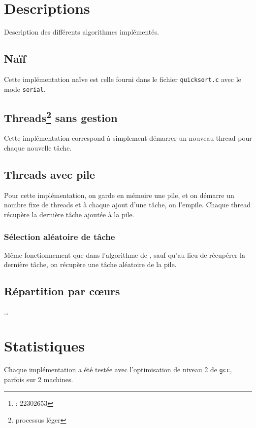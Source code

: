 \documentclass{article}
\title{\docTitle}
\author{\href{\authorMail}{\anri}\thanks{\anri : 22302653}}
\date{Année universitaire 2023-2024}
\newcommand{\docref}[1]{\textit{\nameref{#1}}} %
\def\coeurs{c\oe{}urs}
\begin{document}
\maketitle
\flushbottom
\tableofcontents
\clearpage

\section{Descriptions}
Description des différents algorithmes implémentés.

\subsection{Naïf}
Cette implémentation naïve est celle fourni dans le fichier
\texttt{quicksort.c} avec le mode \texttt{serial}.

\subsection[Threads sans gestion]{%
  Threads\footnote{processus léger} sans gestion}
Cette implémentation correspond à simplement démarrer un nouveau thread
pour chaque nouvelle tâche.

\subsection{Threads avec pile}\label{desc:th_pile}
Pour cette implémentation, on garde en mémoire une pile,
et on démarre un nombre fixe de threads et à chaque ajout d'une tâche,
on l'empile. Chaque thread récupère la dernière tâche ajoutée à la pile.

\subsubsection{Sélection aléatoire de tâche}
Même fonctionnement que dans l'algorithme de \docref{desc:th_pile}, sauf
qu'au lieu de récupérer la dernière tâche, on récupère une tâche
aléatoire de la pile.

\subsection{Répartition par \coeurs}
\dots

\section{Statistiques}
Chaque implémentation a été testée avec l'optimisation de niveau 2
de \texttt{gcc}, parfois sur 2 machines.
\end{document}
